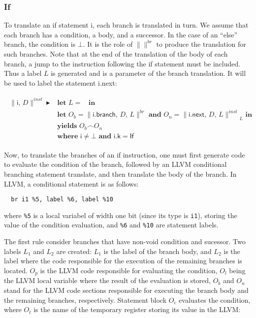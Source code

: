 \documentclass{article}
\newcommand{\trad}[2]{\ensuremath{\lVert \textsf{#1} \rVert^{\textit{#2}}}}
\DeclareMathOperator{\conc}{\smallfrown}
\DeclareMathOperator{\isdef}{\blacktriangleright}
\DeclareMathOperator{\name}{\mathcal{L}()}
\begin{document}
\subsubsection{If}

To translate an if statement \textsf{i}, each branch is translated in
turn. We assume that each branch has a condition, a body, and a
successor. In the case of an ``else'' branch, the condition is $\bot$.
It is the role of $\trad{}{br}$ to produce the translation for such
branches. Note that at the end of the translation of the body of each
branch, a jump to the instruction following the if statement must be
included. Thus a label $L$ is generated and is a parameter of the
branch translation. It will be used to label the statement
\textsf{i.next}:
\begin{framed}
\begin{align}
\begin{split}
  \trad{i, $D$}{inst} \isdef 
  & \textbf{let } L = \name \textbf{ in} \\
  & \textbf{let } O_b = \trad{i.branch, $D$, $L$}{br} \textbf{ and }
  O_n = \trad{i.next, $D$, $L$}{inst}_L \textbf{ in}  \\
  & \textbf{yields } O_b \conc O_n  \\
  & \textbf{where } \textsf{i} \ne \bot \textbf{ and } \textsf{i.k} = \textsf{If} 
\end{split}
\end{align}
\end{framed}

Now, to translate the branches of an if instruction, one must first
generate code to evaluate the condition of the branch, followed by an
LLVM conditional branching statement translate, and then translate the
body of the branch. In LLVM, a conditional statement is as follows:
\begin{verbatim}
  br i1 %5, label %6, label %10
\end{verbatim}
where \texttt{\%5} is a local variabel of width one bit (since its
type is \texttt{i1}), storing the value of the condition evaluation,
and \texttt{\%6} and \texttt{\%10} are statement labels.

The first rule consider branches that have non-void condition and
sucessor.  Two labels $L_1$ and $L_2$ are created: $L_1$ is the label
of the branch body, and $L_2$ is the label where the code responsible
for the execution of the remaining branches is located. $O_p$ is the
LLVM code responsible for evaluating the condition, $O_l$ being the
LLVM local variable where the result of the evaluation is stored,
$O_b$ and $O_n$ stand for the LLVM code sections responsible for
executing the branch body and the remaining branches, respectively.
Statement block $O_c$ evaluates the condition, where $O_t$ is the name
of the temporary register storing its value in the LLVM:
\end{document}
